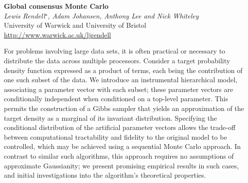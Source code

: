 \documentclass[12pt]{article}
\newcommand{\postertitle}[1]{{\Large\bf #1}\\[12pt]}
\newcommand{\authors}[1]{\emph{#1}\\}
\newcommand{\affiliations}[1]{{#1}\\}
\newcommand{\contacts}[1]{{#1}}
\begin{document}
\begin{center}
\vspace*{0.5cm}
%
\postertitle{Global consensus Monte Carlo}
%
\authors{Lewis Rendell$^\star$, Adam Johansen, Anthony Lee and Nick Whiteley} %
% 
\affiliations{University of Warwick and University of Bristol}
%
\contacts{\url{http://www.warwick.ac.uk/ljrendell}} %
%
\vspace*{0.3cm}
\end{center}

For problems involving large data sets, it is often practical or necessary to distribute the data across multiple processors. Consider a target probability density function expressed as a product of terms, each being the contribution of one such subset of the data. We introduce an instrumental hierarchical model, associating a parameter vector with each subset; these parameter vectors are conditionally independent when conditioned on a top-level parameter. This permits the construction of a Gibbs sampler that yields an approximation of the target density as a marginal of its invariant distribution. Specifying the conditional distribution of the artificial parameter vectors allows the trade-off between computational tractability and fidelity to the original model to be controlled, which may be achieved using a sequential Monte Carlo approach. In contrast to similar such algorithms, this approach requires no assumptions of approximate Gaussianity; we present promising empirical results in such cases, and initial investigations into the algorithm's theoretical properties.


\end{document}
